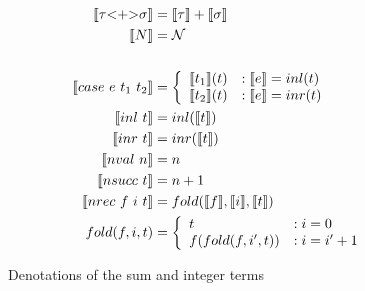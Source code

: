   \begin{figure}
    \centering
    \begin{equation*}
      \begin{split}
        \llbracket \tau \text{<+>} \sigma \rrbracket &= \llbracket \tau \rrbracket + \llbracket \sigma \rrbracket \\
        \llbracket N \rrbracket &= \mathcal{N} \\
        \\
        \llbracket case\ e\ t_1\ t_2 \rrbracket &=
          \left\{
            \begin{array}{ll}
              \llbracket t_1 \rrbracket(t)
                & : \llbracket e \rrbracket = inl(t) \\
              \llbracket t_2 \rrbracket(t)
                & : \llbracket e \rrbracket = inr(t) \\
            \end{array}
          \right. \\
        \llbracket inl\ t \rrbracket &= inl(\llbracket t \rrbracket) \\
        \llbracket inr\ t \rrbracket &= inr(\llbracket t \rrbracket) \\
        \llbracket nval\ n \rrbracket &= n \\
        \llbracket nsucc\ t \rrbracket &= n + 1 \\
        \llbracket nrec\ f\ i\ t \rrbracket &= fold(\llbracket f \rrbracket, \llbracket i \rrbracket, \llbracket t \rrbracket) \\
        fold(f, i, t) &=
          \left\{
            \begin{array}{ll}
              t &: i = 0 \\
              f(fold(f, i', t))
                &: i = i' + 1 \\
            \end{array}
          \right. \\
      \end{split}
    \end{equation*}
    \caption{Denotations of the sum and integer terms}
    \label{eqn:denotation_base}
  \end{figure}
